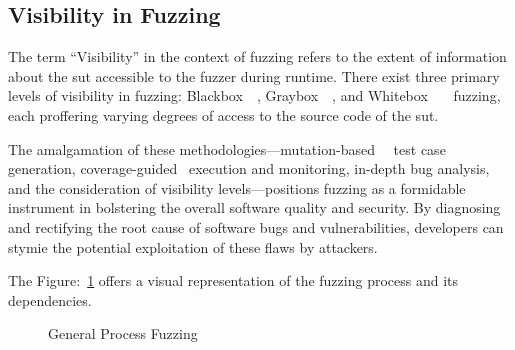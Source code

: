 \subsection*{Visibility in Fuzzing}

The term ``Visibility'' in the context of fuzzing refers to the extent of information about the
\acrshort{sut} accessible to the fuzzer during runtime. There exist three primary levels of visibility in
fuzzing: Blackbox~\cite{godefroid2007random}~\cite{manes2019art},
Graybox~\cite{canakci2021directfuzz}~\cite{li2018fuzzing}, and
Whitebox~\cite{godefroid2008automated}~\cite{godefroid2007random}~\cite{godefroid2008grammar} fuzzing,
each proffering varying degrees of access to the source code of the \acrshort{sut}.

The amalgamation of these methodologies—mutation-based~\cite{lyu2022ems}~\cite{miller2007analysis}
test case generation, coverage-guided~\cite{jaaskela2016genetic} execution and monitoring, in-depth bug analysis,
and the consideration of visibility levels—positions fuzzing as a formidable instrument
in bolstering the overall software quality and security. By diagnosing and
rectifying the root cause of software bugs and vulnerabilities, developers
can stymie the potential exploitation of these flaws by attackers.

The Figure:~\ref{fig:general_process_fuzzing} offers a visual representation of the
fuzzing process and its dependencies.



\begin{figure}[h]
        \centering
        \caption{General Process Fuzzing~\cite{liang2018fuzzing}}\label{fig:general_process_fuzzing}
\end{figure}

